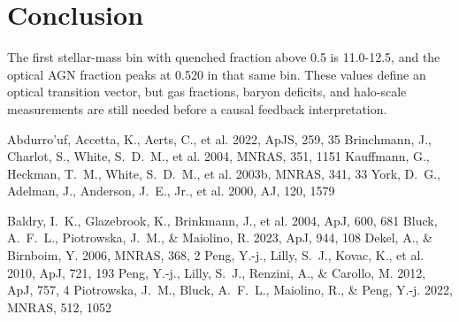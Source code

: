 \documentclass[twocolumn]{aastex631}
\begin{document}
\section{Conclusion}\label{sec:conclusion}
The first stellar-mass bin with quenched fraction above 0.5 is 11.0-12.5, and the optical AGN fraction peaks at 0.520 in that same bin. These values define an optical transition vector, but gas fractions, baryon deficits, and halo-scale measurements are still needed before a causal feedback interpretation.


\begin{thebibliography}{}
 Abdurro'uf, Accetta, K., Aerts, C., et al. 2022, ApJS, 259, 35
 Brinchmann, J., Charlot, S., White, S.~D.~M., et al. 2004, MNRAS, 351, 1151
 Kauffmann, G., Heckman, T.~M., White, S.~D.~M., et al. 2003b, MNRAS, 341, 33
 York, D.~G., Adelman, J., Anderson, J.~E., Jr., et al. 2000, AJ, 120, 1579

 Baldry, I.~K., Glazebrook, K., Brinkmann, J., et al. 2004, ApJ, 600, 681
 Bluck, A.~F.~L., Piotrowska, J.~M., \& Maiolino, R. 2023, ApJ, 944, 108
 Dekel, A., \& Birnboim, Y. 2006, MNRAS, 368, 2
 Peng, Y.-j., Lilly, S.~J., Kovac, K., et al. 2010, ApJ, 721, 193
 Peng, Y.-j., Lilly, S.~J., Renzini, A., \& Carollo, M. 2012, ApJ, 757, 4
 Piotrowska, J.~M., Bluck, A.~F.~L., Maiolino, R., \& Peng, Y.-j. 2022, MNRAS, 512, 1052
\end{thebibliography}
\end{document}
